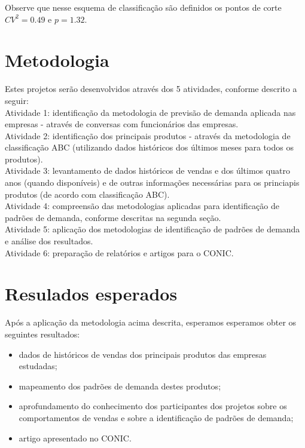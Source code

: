 \documentclass[11pt,letterpaper,twocolumn]{article}
\begin{document}
Observe que nesse esquema de classificação são definidos os pontos de corte $CV^2=0.49$ e $p=1.32$.

\section{Metodologia}

Estes projetos serão desenvolvidos através dos 5 atividades, conforme descrito a seguir:\\

Atividade 1: identificação da metodologia de previsão de demanda aplicada nas empresas - através de conversas com funcionários das empresas.\\

Atividade 2: identificação dos principais produtos - através da metodologia de classificação ABC (utilizando dados históricos dos últimos meses para todos os produtos).\\

Atividade 3: levantamento de dados históricos de vendas e dos últimos quatro anos (quando disponíveis) e de outras informações necessárias para os princiapis produtos (de acordo com classificação ABC).\\

Atividade 4: compreensão das metodologias aplicadas para identificação de padrões de demanda, conforme descritas na segunda seção.\\

Atividade 5: aplicação dos metodologias de identificação de padrões de demanda e análise dos resultados.\\

Atividade 6: preparação de relatórios e artigos para o CONIC.

\section{Resulados esperados}

Após a aplicação da metodologia acima descrita, esperamos esperamos obter os seguintes resultados: 

\begin{itemize}
    \item dados de históricos de vendas dos principais produtos das empresas estudadas;
    \item mapeamento dos padrões de demanda destes produtos;
    \item aprofundamento do conhecimento dos participantes dos projetos sobre os comportamentos de vendas e sobre a identificação de padrões de demanda;
    \item artigo apresentado no CONIC.
\end{itemize}
\end{document}

